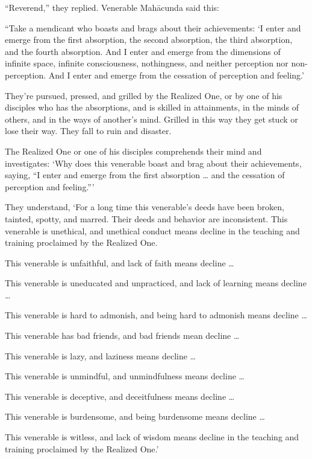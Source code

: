 \documentclass[12pt,openany]{book}%
\begin{document}
“Reverend,” they replied. Venerable \textsanskrit{Mahācunda} said this: 

“Take a mendicant who boasts and brags about their achievements: ‘I enter and emerge from the first absorption, the second absorption, the third absorption, and the fourth absorption. And I enter and emerge from the dimensions of infinite space, infinite consciousness, nothingness, and neither perception nor non-perception. And I enter and emerge from the cessation of perception and feeling.’ 

They’re pursued, pressed, and grilled by the Realized One, or by one of his disciples who has the absorptions, and is skilled in attainments, in the minds of others, and in the ways of another’s mind. Grilled in this way they get stuck or lose their way. They fall to ruin and disaster. 

The Realized One or one of his disciples comprehends their mind and investigates: ‘Why does this venerable boast and brag about their achievements, saying, “I enter and emerge from the first absorption … and the cessation of perception and feeling.”’ 

They understand, ‘For a long time this venerable’s deeds have been broken, tainted, spotty, and marred. Their deeds and behavior are inconsistent. This venerable is unethical, and unethical conduct means decline in the teaching and training proclaimed by the Realized One. 

This venerable is unfaithful, and lack of faith means decline … 

This venerable is uneducated and unpracticed, and lack of learning means decline … 

This venerable is hard to admonish, and being hard to admonish means decline … 

This venerable has bad friends, and bad friends mean decline … 

This venerable is lazy, and laziness means decline … 

This venerable is unmindful, and unmindfulness means decline … 

This venerable is deceptive, and deceitfulness means decline … 

This venerable is burdensome, and being burdensome means decline … 

This venerable is witless, and lack of wisdom means decline in the teaching and training proclaimed by the Realized One.’ 
\end{document}

